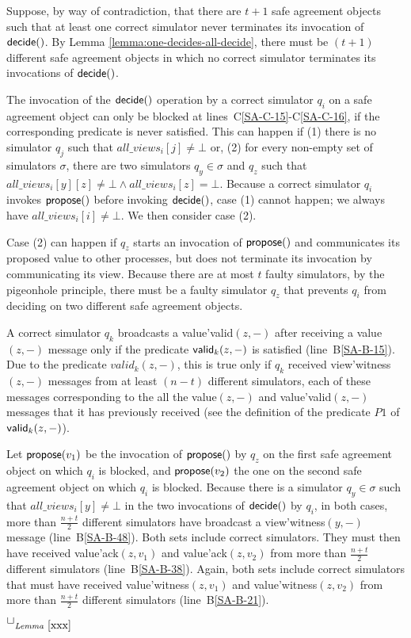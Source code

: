 \documentclass[11pt,letterpaper]{article}
\newlength {\afterproof}
\newcommand{\toto}{xxx}
\newenvironment{proofL}{\noindent{\bf Proof }}
{\hspace*{\fill}$\Box_{\mathit{Lemma}~\ref{\toto}}$\par\vspace{\afterproof}}
\begin{document}
\begin{proofL}
Suppose, by way of contradiction, that there are $t+1$ safe agreement 
objects such that at least one correct simulator never terminates its 
invocation of ${\sf decide}()$. By Lemma 
\ref{lemma:one-decides-all-decide}, there must be 
 $(t+1)$ different safe agreement objects in which 
no correct simulator  terminates its invocations of ${\sf decide}()$.



The invocation of the ${\sf decide}()$ operation by a correct simulator 
$q_i$ on a safe agreement object can only be blocked at 
lines~C\ref{SA-C-15}-C\ref{SA-C-16}, if the corresponding predicate is 
never satisfied. This can happen if (1) there is no simulator $q_j$ such 
that $all\_views_i[j] \neq \bot$ or, (2) for every non-empty set of 
simulators $\sigma$, there are  two  simulators $q_y\in\sigma$ and  $q_z$ 
such that $all\_views_i[y][z] \neq \bot \wedge all\_views_i[z] = \bot$.
Because a correct simulator $q_i$ invokes  ${\sf propose}()$  
before invoking ${\sf decide}()$, case (1) cannot happen; we always have 
$all\_views_i[i] \neq \bot$. We then consider case (2). 

Case (2) can happen if $q_z$ starts an invocation of 
${\sf propose}()$ and communicates its proposed value to other processes, 
but does not terminate its invocation by communicating its view.
Because there are at most $t$ faulty simulators, by the pigeonhole 
principle, there must be a faulty simulator $q_z$ that prevents $q_i$ from 
deciding on two different safe agreement objects.

A correct simulator $q_k$ broadcasts a {\sc value'valid}$(z,-)$
after receiving a {\sc value}$(z,-)$ message only if the predicate 
${\sf valid}_k(z,-)$ is satisfied (line~B\ref{SA-B-15}). 
Due to the predicate $valid_k(z,-)$, this is true only if $q_k$ received 
{\sc view'witness}$(z,-)$ messages from at least $(n-t)$ different 
simulators, each of these messages corresponding to the all the  
{\sc value}$(z,-)$ and {\sc value'valid}$(z,-)$ messages 
that it has previously received (see the definition of the predicate $P1$ of 
${\sf valid}_k(z,-)$). 

Let ${\sf propose}(v_1)$ be the invocation of ${\sf propose}()$ by $q_z$ on 
the first safe agreement object on which $q_i$ is blocked, and 
${\sf propose}(v_2)$ the one on the second safe agreement object on which 
$q_i$ is blocked. Because there is a simulator $q_y\in\sigma$ such that 
$all\_views_i[y] \neq \bot$ in the two invocations of ${\sf decide}()$ by 
$q_i$, in both cases, more than $\frac{n+t}{2}$ different simulators
have broadcast a {\sc view'witness}$(y,-)$ message (line~B\ref{SA-B-48}). 
Both sets  include correct simulators. They 
must then have received {\sc value'ack}$(z,v_1)$ and 
{\sc value'ack}$(z,v_2)$ from more than $\frac{n+t}{2}$ different 
simulators (line~B\ref{SA-B-38}). Again, both sets  include correct 
simulators that must have received {\sc value'witness}$(z,v_1)$ and 
{\sc value'witness}$(z,v_2)$ from more than $\frac{n+t}{2}$ different 
simulators (line~B\ref{SA-B-21}).


\end{proofL}
\end{document}

